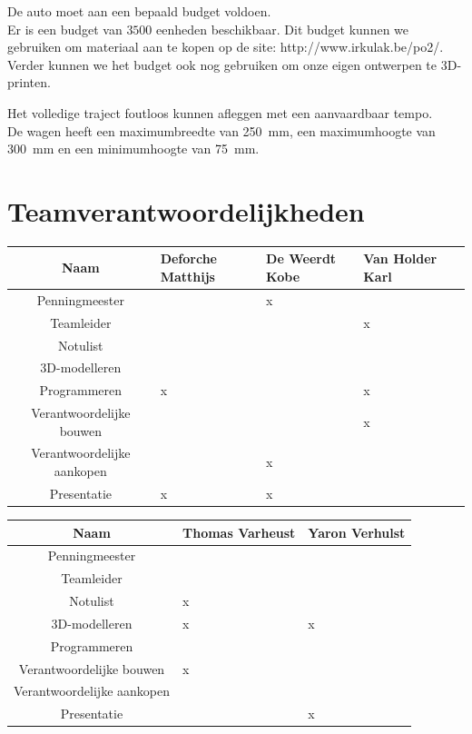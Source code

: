 \documentclass[a4paper,twoside,kulak]{kulakreport}
\begin{document}
	 
	 
	 \bigskip
	 
	 De auto moet aan een bepaald budget voldoen.\\
	 Er is een budget van $3500$ eenheden beschikbaar. Dit budget kunnen we gebruiken om materiaal aan te kopen op de site: http://www.irkulak.be/po2/.
	 Verder kunnen we het budget ook nog gebruiken om onze eigen ontwerpen te 3D-printen. 
	 
	 \bigskip
	 Het volledige traject foutloos kunnen afleggen met een aanvaardbaar tempo.\\
	 De wagen heeft een maximumbreedte van 250~mm, een maximumhoogte van 300~mm en een minimumhoogte van 75~mm.
	 
	 \newpage
	
	\section{Teamverantwoordelijkheden}
		\begin{tabular}{|c||l|l|l|l|}
		\hline
		Naam & Deforche Matthijs & De Weerdt Kobe & Van Holder Karl   \\ \hline \hline
		
		Penningmeester             &  &x &   \\ \hline
		Teamleider                 &  &  &x   \\ \hline      
		Notulist                   &  &  &    \\ \hline
		3D-modelleren              &  &  &   \\ \hline
		Programmeren               &x &  &x   \\ \hline
		Verantwoordelijke bouwen   &  &  &x  \\ \hline
		Verantwoordelijke aankopen &  &x &   \\ \hline
		Presentatie                &x &x &    \\ \hline
		
		
	\end{tabular}
	
	\bigskip
	
	\begin{tabular}{|c||l|l|}
			\hline
		Naam & Thomas Varheust & Yaron Verhulst   \\ \hline \hline
		
		Penningmeester             &  &    \\ \hline
		Teamleider                 &  &     \\ \hline      
		Notulist                   &x  &      \\ \hline
		3D-modelleren              &x  &x     \\ \hline
		Programmeren               & &     \\ \hline
		Verantwoordelijke bouwen   &x  &    \\ \hline
		Verantwoordelijke aankopen &  &   \\ \hline
		Presentatie                & &x    \\ \hline
	\end{tabular}
	
\end{document}
